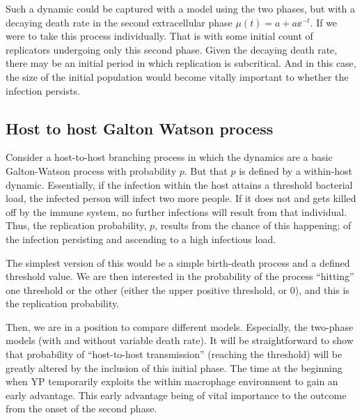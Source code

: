 Such a dynamic could be captured with a model using the two phases, but with a decaying death rate in the second extracellular phase
$\mu(t) = a + a\ee^{-t}$. If we were to take this process individually. That is with some initial count of replicators undergoing only this second phase. Given the decaying death rate, there may be an initial period in which replication is subcritical. And in this case, the size of the initial population would become vitally important to whether the infection persists.







\subsection{Host to host Galton Watson process}



Consider a host-to-host branching process in which the dynamics are a basic Galton-Watson process with probability $p$. But that $p$ is defined by a within-host dynamic. Essentially, if the infection within the host attains a threshold bacterial load, the infected person will infect two more people. If it does not and gets killed off by the immune system, no further infections will result from that individual. Thus, the replication probability, $p$, results from the chance of this happening; of the infection persisting and ascending to a high infectious load. \par

The simplest version of this would be a simple birth-death process and a defined threshold value.  We are then interested in the probability of the process ``hitting'' one threshold or the other (either the upper positive threshold, or 0), and this is the replication probability.\par

Then, we are in a position to compare different models. Especially, the two-phase models (with and without variable death rate). It will be straightforward to show that probability of ``host-to-host transmission''  (reaching the threshold) will be greatly altered by the inclusion of this initial phase. The time at the beginning when YP temporarily exploits the within macrophage environment to gain an early advantage. This early advantage being of vital importance to the outcome from the onset of the second phase. 






